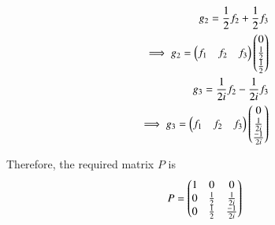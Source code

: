 \documentclass[journal,12pt,twocolumn]{IEEEtran}
\begin{document}
\begin{enumerate}[label=(\alph*)]
		\begin{align}
			g_2 = \frac{1}{2}f_2 + \frac{1}{2}f_3 \\
			\implies g_2 = \begin{pmatrix}f_1 & f_2 & f_3\end{pmatrix} \begin{pmatrix}0\\\frac{1}{2}\\\frac{1}{2}\end{pmatrix} \\
			g_3 = \frac{1}{2i}f_2 - \frac{1}{2i}f_3 \\
			\implies g_3 = \begin{pmatrix}f_1 & f_2 & f_3\end{pmatrix} \begin{pmatrix}0\\\frac{1}{2i}\\\frac{-1}{2i}\end{pmatrix}
		\end{align}
		
		Therefore, the required matrix $P$ is
		\begin{align}
			P = \begin{pmatrix}1&0&0\\0&\frac{1}{2}&\frac{1}{2i}\\0&\frac{1}{2}&\frac{-1}{2i}\end{pmatrix}
		\end{align}
		
	\end{enumerate}
	
\end{document}
